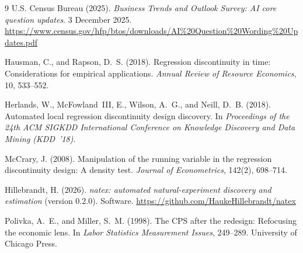 \documentclass[11pt]{article}
\begin{document}
\begin{thebibliography}{9}
U.S. Census Bureau (2025).
\emph{Business Trends and Outlook Survey: AI core question updates}.
3 December 2025.
\url{https://www.census.gov/hfp/btos/downloads/AI\%20Question\%20Wording\%20Updates.pdf}

Hausman, C., and Rapson, D.~S. (2018).
Regression discontinuity in time: Considerations for empirical applications.
\emph{Annual Review of Resource Economics}, 10, 533--552.

Herlands, W., McFowland~III, E., Wilson, A.~G., and Neill, D.~B. (2018).
Automated local regression discontinuity design discovery.
In \emph{Proceedings of the 24th ACM SIGKDD International Conference on
Knowledge Discovery and Data Mining (KDD~'18)}.

McCrary, J. (2008).
Manipulation of the running variable in the regression discontinuity design:
A density test.
\emph{Journal of Econometrics}, 142(2), 698--714.

Hillebrandt, H. (2026).
\emph{natex: automated natural-experiment discovery and estimation} (version
0.2.0). Software.
\url{https://github.com/HaukeHillebrandt/natex}

Polivka, A.~E., and Miller, S.~M. (1998).
The CPS after the redesign: Refocusing the economic lens.
In \emph{Labor Statistics Measurement Issues}, 249--289.
University of Chicago Press.

\end{thebibliography}
\end{document}
